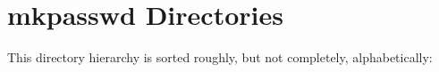 \section{mkpasswd Directories}
This directory hierarchy is sorted roughly, but not completely, alphabetically:\begin{CompactList}
\item {}
\end{CompactList}
